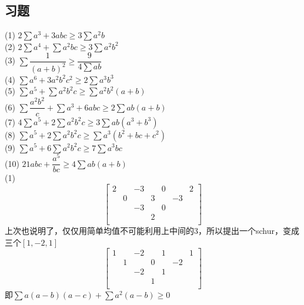 \documentclass[UTF8]{ctexart}
\begin{document}
\subsection{习题}
\noindent (1) $2 \displaystyle  \sum a^{3}+3 a b c \geq 3\displaystyle  \sum  a^{2} b$\\
(2) $2\displaystyle  \sum  a^{4}+\displaystyle  \sum  a^{2} b c \geq 3 \sum a^{2} b^{2}$\\
(3) $ \displaystyle  \sum \dfrac{1}{(a+b)^{2}} \geq \dfrac{9}{4 \displaystyle  \sum a b}$\\
(4) $\displaystyle  \sum  a^{6}+3 a^{2} b^{2} c^{2} \geq 2 \displaystyle  \sum  a^{3} b^{3}$\\
(5) $\displaystyle  \sum a^{5}+\displaystyle  \sum  a^{2} b^{2} c \geq \displaystyle  \sum a^{2} b^{2}(a+b)$\\
(6) $ \displaystyle  \sum  \dfrac{a^{2} b^{2}}{c}+\displaystyle  \sum  a^{3}+6 a b c \geq 2 \displaystyle  \sum  a b(a+b)$\\
(7) $4 \displaystyle  \sum a^{5}+2\sum a^{2} b^{2} c \geq 3 \displaystyle  \sum  a b\left(a^{3}+b^{3}\right)$\\
(8) $\displaystyle  \sum  a^{5}+2  \displaystyle  \sum  a^{2} b^{2} c \geq \displaystyle  \sum  a^{3}\left(b^{2}+b c+c^{2}\right)$\\
(9) $\displaystyle  \sum a^{5}+6  \displaystyle  \sum a^{2} b^{2} c \geq 7 \displaystyle  \sum  a^{3} b c$\\
(10) $21 a b c+\dfrac{a^{5}}{b c} \geq 4\displaystyle  \sum  a b(a+b)$\\
\noindent (1)  \renewcommand*{\arraystretch}{1.732}\[\left[\begin{matrix}
	2& &-3& &0& &2\\
	&0& &3& &-3&\\
	& &-3& &0& & \\
	& & &2& & &\\
\end{matrix}\right]\] 
上次也说明了，仅仅用简单均值不可能利用上中间的3，所以提出一个schur，变成三个$ [1,-2,1] $
 \renewcommand*{\arraystretch}{1.732}\[\left[\begin{matrix}
	1& &-2& &1& &1\\
	&1& &0& &-2&\\
	& &-2& &1& & \\
	& & &1& & &\\
\end{matrix}\right]\]
即$ \displaystyle \sum a(a-b)(a-c)+\displaystyle \sum a^{2}(a-b)\geq 0 $\\
\end{document}
